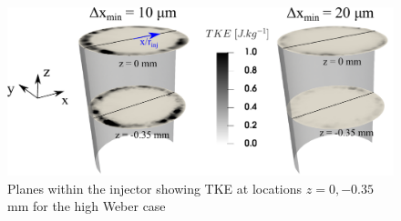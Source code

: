 \begin{figure}[ht]
	\centering
   \includegraphics[scale=0.5]{./part2_developments/figures_ch5_resolved_JICF/instabilities_resolution/injector_visualization_disks}
   \vspace*{-0.1in}
   \caption{Planes within the injector showing TKE at locations $z = 0, -0.35$ mm for the high Weber case}
   \label{fig:jicf_nozzle_disks}
\end{figure}



